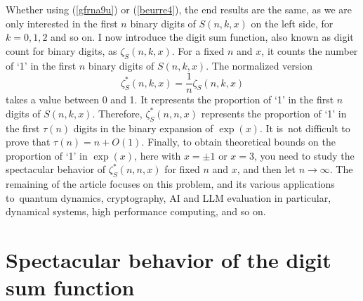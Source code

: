 \documentclass[10pt]{article}
\begin{document}
Whether using (\ref{gfrna9u}) or (\ref{beurre4}), the end results are the same, as we are only interested in the 
 first $n$ binary digits of $S(n, k, x)$ on the left side, for $k=0, 1, 2$ and so on. I now introduce the 
\textcolor{index}{digit sum} function,
 also known as \textcolor{index}{digit count} for binary digits, as $\zeta   _S(n, k, x)$. For a fixed $n$ and $x$, it counts the number of `1' in the first $n$ binary digits of $S(n, k, x)$. The normalized version
\begin{equation}
\zeta   _S^*(n,k, x) = \frac{1}{n} \zeta   _S(n, k, x) \label{oxyver}
\end{equation}
takes a value between 0 and 1. It represents the proportion of `1' in the first $n$ digits of $S(n,k,x)$. 
Therefore, $\zeta   _S^*(n, n, x)$ represents the proportion of `1' in the first $\tau(n)$ digits in the binary expansion of $\exp(x)$. It is~not difficult to prove that
 $\tau(n) = n + O(1)$. Finally, to obtain theoretical bounds on the proportion of `1' in $\exp(x)$, here with
$x=\pm 1$ or $x= 3$, you need to study the spectacular behavior of $\zeta   _S^*(n, n, x)$ for fixed $n$ and $x$, and then
let $n\rightarrow\infty$. The remaining of the article focuses on this problem, and its various applications
 to~quantum dynamics, cryptography, AI and LLM evaluation in particular, dynamical systems, high performance computing, and so on.  

\section{Spectacular behavior of the digit sum function}
\end{document}
